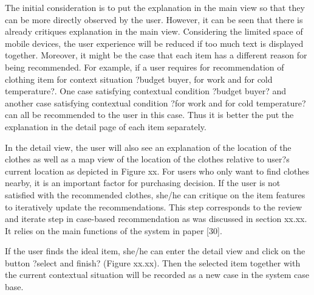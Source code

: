 The initial consideration is to put the explanation in the main view so that they can be more directly observed by the user. However, it can be seen that there is already critiques explanation in the main view. Considering the limited space of mobile devices, the user experience will be reduced if too much text is displayed together. Moreover, it might be the case that each item has a different reason for being recommended. For example, if a user requires for recommendation of clothing item for context situation ?budget buyer, for work and for cold temperature?. One case satisfying contextual condition ?budget buyer? and another case satisfying contextual condition ?for work and for cold temperature? can all be recommended to the user in this case. Thus it is better the put the explanation in the detail page of each item separately.

In the detail view, the user will also see an explanation of the location of the clothes as well as a map view of the location of the clothes relative to user?s current location as depicted in Figure xx. For users who only want to find clothes nearby, it is an important factor for purchasing decision. If the user is not satisfied with the recommended clothes, she/he can critique on the item features to iteratively update the recommendations. This step corresponds to the review and iterate step in case-based recommendation as was discussed in section xx.xx. It relies on the main functions of the system in paper [30].

If the user finds the ideal item, she/he can enter the detail view and click on the button ?select and finish? (Figure xx.xx). Then the selected item together with the current contextual situation will be recorded as a new case in the system case base. 




















